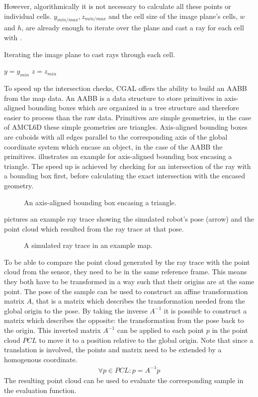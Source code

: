 \documentclass[Thesis.tex]{subfiles}
\begin{document}
However, algorithmically it is not necessary to calculate all these points or individual cells. $y_{min/max}, z_{min/max}$ and the cell size of the image plane's cells, $w$ and $h$, are already enough to iterate over the plane and cast a ray for each cell with .
%
\begin{algorithm}[!htp]
\caption{Iterating the image plane to cast rays through each cell.}
\label{alg:iterate_imageplane}
$y = y_{min}$\;
$z = z_{min}$\;
\end{algorithm}
%
To speed up the intersection checks, \gls{CGAL} offers the ability to build an \gls{AABB} from the map data\cite[]{cgal:atw-aabb-14b}. An \gls{AABB} is a data structure to store primitives in axis-aligned bounding boxes which are organized in a tree structure and therefore easier to process than the raw data. Primitives are simple geometries, in the case of \gls{AMCL6D} these simple geometries are triangles. Axis-aligned bounding boxes are cuboids with all edges parallel to the corresponding axis of the global coordinate system which encase an object, in the case of the \gls{AABB} the primitives.  illustrates an example for axis-aligned bounding box encasing a triangle. 
The speed up is achieved by checking for an intersection of the ray with a bounding box first, before calculating the exact intersection with the encased geometry.
\begin{figure}%
\caption{An axis-aligned bounding box encasing a triangle.}%
\label{fig:aabb_ex}%
\end{figure}
%
 pictures an example ray trace showing the simulated robot's pose (arrow) and the point cloud which resulted from the ray trace at that pose.
\begin{figure}[!htp]
  \caption{A simulated ray trace in an example map.}
  \label{fig:raytrace}
\end{figure}
%
To be able to compare the point cloud generated by the ray trace with the point cloud from the sensor, they need to be in the same reference frame. This means they both have to be transformed in a way such that their origins are at the same point. The pose of the sample can be used to construct an affine transformation matrix $A$, that is a matrix which describes the transformation needed from the global origin to the pose. By taking the inverse $A^{-1}$ it is possible to construct a matrix which describes the opposite: the transformation from the pose back to the origin. This inverted matrix $A^{-1}$ can be applied to each point $p$ in the point cloud $PCL$ to move it to a position relative to the global origin. Note that since a translation is involved, the points and matrix need to be extended by a homogenous coordinate.
%
\begin{align}
  \forall p \in PCL: p = A^{-1} \dot p
\end{align}
%
The resulting point cloud can be used to evaluate the corresponding sample in the evaluation function.
%
%
%
\end{document}
